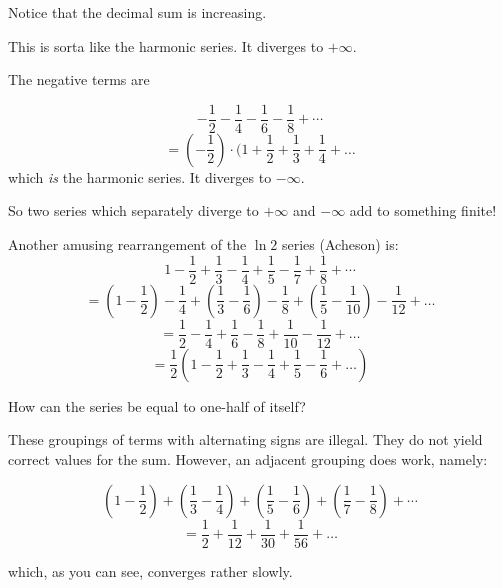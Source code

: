 \documentclass[11pt, oneside]{article}
\begin{document}
Notice that the decimal sum is increasing.

This is sorta like the harmonic series.  It diverges to $+ \infty$.

The negative terms are

\[ - \frac{1}{2} - \frac{1}{4} - \frac{1}{6} - \frac{1}{8} + \cdots \]
\[ = (-\frac{1}{2}) \cdot (1 + \frac{1}{2} + \frac{1}{3} + \frac{1}{4} + \dots \]
which \emph{is} the harmonic series.  It diverges to $- \infty$.

So two series which separately diverge to $+ \infty$ and  $- \infty$ add to something finite!

Another amusing rearrangement of the $\ln 2$ series (Acheson) is:
\[ 1 - \frac{1}{2} + \frac{1}{3} - \frac{1}{4} + \frac{1}{5} - \frac{1}{7} + \frac{1}{8} +  \cdots \]
\[ = (1 - \frac{1}{2}) - \frac{1}{4} + (\frac{1}{3} - \frac{1}{6}) - \frac{1}{8} + (\frac{1}{5} - \frac{1}{10}) - \frac{1}{12} + \dots \]
\[ = \frac{1}{2} - \frac{1}{4} + \frac{1}{6} - \frac{1}{8} + \frac{1}{10} - \frac{1}{12} + \dots \]
\[ = \frac{1}{2} (1 - \frac{1}{2} + \frac{1}{3} - \frac{1}{4} + \frac{1}{5} - \frac{1}{6} + \dots) \]

How can the series be equal to one-half of itself?

These groupings of terms with alternating signs are illegal.  They do not yield correct values for the sum.  However, an adjacent grouping does work, namely:

\[ (1 - \frac{1}{2}) + (\frac{1}{3} - \frac{1}{4}) + (\frac{1}{5} - \frac{1}{6}) + (\frac{1}{7} - \frac{1}{8}) +   \cdots \]
\[ = \frac{1}{2} + \frac{1}{12} + \frac{1}{30} + \frac{1}{56} + \dots \]

which, as you can see, converges rather slowly.
\end{document}

